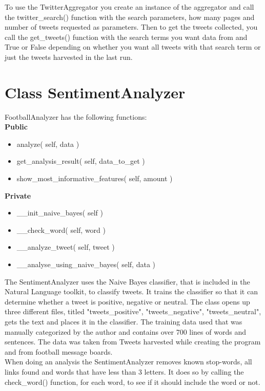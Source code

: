 To use the TwitterAggregator you create an instance of the aggregator and call the twitter\_search() function with the search parameters, how many pages and number of tweets requested as parameters. Then to get the tweets collected, you call the get\_tweets() function with the search terms you want data from and True or False depending on whether you want all tweets with that search term or just the tweets harvested in the last run.\\

\section{Class SentimentAnalyzer} \label{sec:SentimentAnalyzerImplementation}
FootballAnalyzer has the following functions:\\

{\bf Public}
\begin{itemize}
\item analyze( self, data )
\item get\_analysis\_result( self, data\_to\_get )
\item show\_most\_informative\_features( self, amount )
\end{itemize}

{\bf Private}
\begin{itemize}
\item \_\_init\_naive\_bayes( self )
\item \_\_check\_word( self, word )
\item \_\_analyze\_tweet( self, tweet )
\item \_\_analyse\_using\_naive\_bayes( self, data )
\end{itemize} 

The SentimentAnalyzer uses the Naive Bayes classifier, that is included in the Natural Language toolkit, to classify tweets. It trains the classifier so that it can determine whether a tweet is positive, negative or neutral. The class opens up three different files, titled "tweets\_positive", "tweets\_negative", "tweets\_neutral", gets the text and places it in the classifier. The training data used that was manually categorized by the author and contains over 700 lines of words and sentences. The data was taken from Tweets harvested while creating the program and from football message boards. \\

When doing an analysis the SentimentAnalyzer removes known stop-words, all links found and words that have less than 3 letters. It does so by calling the check\_word() function, for each word, to see if it should include the word or not.\\

